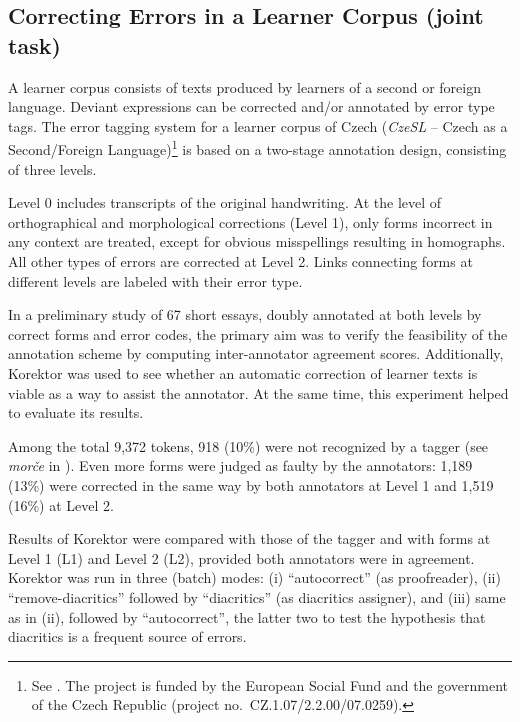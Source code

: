 \documentclass[11pt]{article}
\begin{document}
\subsection{Correcting Errors in a Learner Corpus (joint task)}
\label{sec:eval-using-learn}

A learner corpus consists of texts produced by 
learners of a second or foreign language. Deviant expressions can be
corrected and/or annotated by error type tags. The
error tagging system for a learner corpus of Czech (\emph{CzeSL} -- Czech as a
Second/Foreign Language)\footnote{See \cite{hana:etal:10}. The project is funded by the European
Social Fund and the government of the Czech Republic (project
no.~CZ.1.07/2.2.00/07.0259).} is based on a two-stage annotation
design, consisting of three levels.

Level 0 includes 
transcripts of the original handwriting. At the level of orthographical and
morphological corrections (Level 1), only forms incorrect in any
context are treated, except for obvious
misspellings resulting in homographs. All other types of errors are corrected at Level 2. Links
connecting forms at different levels are labeled with their error
type. 


In a preliminary study of 67 short essays, doubly annotated at both
levels by correct forms and error codes, the primary aim was to verify
the feasibility of the annotation scheme by computing inter-annotator
agreement scores. Additionally, Korektor
was used to see whether an automatic correction of learner texts is
viable as a way to assist the annotator. At the same time, this
experiment helped to evaluate its results.

Among the total 9,372 tokens,
918 (10\%) were not recognized by
a tagger (see \emph{morče} in 
\cite{spoustova:etal:07}). Even more forms were judged
as faulty by the annotators: 1,189 (13\%) were corrected in the same
way by both annotators at Level 1 and 1,519 (16\%) at Level 2.

Results of Korektor were compared with those of the
tagger and with forms at Level 1 (L1) and Level 2 (L2), provided
both annotators were in agreement. Korektor was run in three
(batch) modes: (i) ``autocorrect'' (as proofreader), (ii)
``remove-diacritics'' followed by ``diacritics'' (as diacritics
assigner), and (iii) same as in (ii), followed by ``autocorrect'', the
latter two to test the hypothesis that diacritics is a frequent source
of errors.
\end{document}
